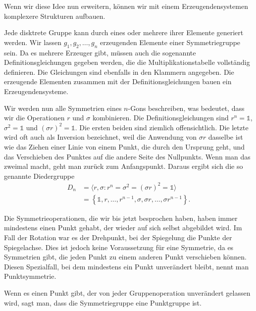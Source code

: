 Wenn wir diese Idee nun erweitern, können wir mit einem Erzeugendensystemen
komplexere Strukturen aufbauen.

\begin{definition}[Erzeugendensysteme]
	Jede disktrete Gruppe kann durch eines oder mehrere ihrer Elemente generiert
	werden.  Wir lassen \(g_1, g_2, \ldots, g_n\) erzeugenden Elemente einer
	Symmetriegruppe sein.  Da es mehrere Erzeuger gibt, müssen auch die
	sogenannte Definitionsgleichungen gegeben werden, die die
	Multiplikationstabelle vollständig definieren. Die Gleichungen sind ebenfalls
	in den Klammern angegeben. Die erzeugende Elementen zusammen mit der
	Definitionsgleichungen bauen ein Erzeugendensysteme.
\end{definition}
\begin{beispiel}
	Wir werden nun alle Symmetrien eines \(n\)-Gons beschreiben, was bedeutet,
	dass wir die Operationen \(r\) und \(\sigma\) kombinieren. Die
	Definitionsgleichungen sind \(r^n = \mathds{1}\), \(\sigma^2 =
	\mathds{1}\) und \((\sigma r)^2 = \mathds{1}\).
	Die ersten beiden sind ziemlich offensichtlich. Die letzte wird oft auch als
	Inversion bezeichnet, weil die Anwendung von \(\sigma r\) dasselbe ist wie
	das Ziehen einer Linie von einem Punkt, die durch den Ursprung geht, und das
	Verschieben des Punktes auf die andere Seite des Nullpunkts. Wenn man das
	zweimal macht, geht man zurück zum Anfangspunkt.
	Daraus ergibt sich die so genannte Diedergruppe 
	\begin{align*}
		D_n &= \langle r, \sigma : r^n = \sigma^2 = (\sigma r)^2 = \mathds{1} \rangle \\
			&= \left\{
					\mathds{1}, r, \ldots, r^{n-1}, \sigma, \sigma r, \ldots, \sigma r^{n-1}
			\right\}.
	\end{align*}
\end{beispiel}

Die Symmetrieoperationen, die wir bis jetzt besprochen haben, haben immer
mindestens einen Punkt gehabt, der wieder auf sich selbst abgebildet wird. Im
Fall der Rotation war es der Drehpunkt, bei der Spiegelung die Punkte der
Spiegelachse. Dies ist jedoch keine Voraussetzung für eine Symmetrie, da es
Symmetrien gibt, die jeden Punkt zu einem anderen Punkt verschieben können.
Diesen Spezialfall, bei dem mindestens ein Punkt unverändert bleibt, nennt man
Punktsymmetrie.
\begin{definition}[Punktgruppe]
	Wenn es einen Punkt gibt, der von jeder Gruppenoperation unverändert gelassen
	wird, sagt man, dass die Symmetriegruppe eine Punktgruppe ist.
\end{definition}

